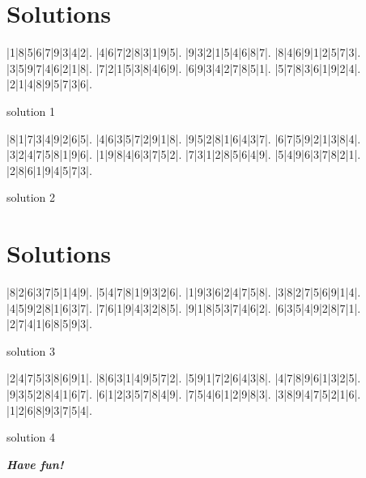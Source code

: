 \documentclass[fontsize=24pt,letterpaper]{scrartcl}
\renewcommand*\sudokuformat[1]{\Large\sffamily#1}
\begin{document}
\clearpage

\section{Solutions}
\setlength\sudokusize{8cm}
\renewcommand*\sudokuformat[1]{\sffamily#1}
\begin{sudoku}
|1|8|5|6|7|9|3|4|2|.
|4|6|7|2|8|3|1|9|5|.
|9|3|2|1|5|4|6|8|7|.
|8|4|6|9|1|2|5|7|3|.
|3|5|9|7|4|6|2|1|8|.
|7|2|1|5|3|8|4|6|9|.
|6|9|3|4|2|7|8|5|1|.
|5|7|8|3|6|1|9|2|4|.
|2|1|4|8|9|5|7|3|6|.
\end{sudoku}
\begin{center}
    solution 1
\end{center}
\vspace{0.2cm}
\begin{sudoku}
|8|1|7|3|4|9|2|6|5|.
|4|6|3|5|7|2|9|1|8|.
|9|5|2|8|1|6|4|3|7|.
|6|7|5|9|2|1|3|8|4|.
|3|2|4|7|5|8|1|9|6|.
|1|9|8|4|6|3|7|5|2|.
|7|3|1|2|8|5|6|4|9|.
|5|4|9|6|3|7|8|2|1|.
|2|8|6|1|9|4|5|7|3|.
\end{sudoku}
\begin{center}
    solution 2
\end{center}


\clearpage
\section{Solutions}
\begin{sudoku}
|8|2|6|3|7|5|1|4|9|.
|5|4|7|8|1|9|3|2|6|.
|1|9|3|6|2|4|7|5|8|.
|3|8|2|7|5|6|9|1|4|.
|4|5|9|2|8|1|6|3|7|.
|7|6|1|9|4|3|2|8|5|.
|9|1|8|5|3|7|4|6|2|.
|6|3|5|4|9|2|8|7|1|.
|2|7|4|1|6|8|5|9|3|.
\end{sudoku}
\begin{center}
    solution 3
\end{center}
\begin{sudoku}
|2|4|7|5|3|8|6|9|1|.
|8|6|3|1|4|9|5|7|2|.
|5|9|1|7|2|6|4|3|8|.
|4|7|8|9|6|1|3|2|5|.
|9|3|5|2|8|4|1|6|7|.
|6|1|2|3|5|7|8|4|9|.
|7|5|4|6|1|2|9|8|3|.
|3|8|9|4|7|5|2|1|6|.
|1|2|6|8|9|3|7|5|4|.
\end{sudoku}
\begin{center}
    solution 4
\end{center}
\clearpage

{\centering\Huge\itshape\bfseries Have fun!\par}
\end{document}
